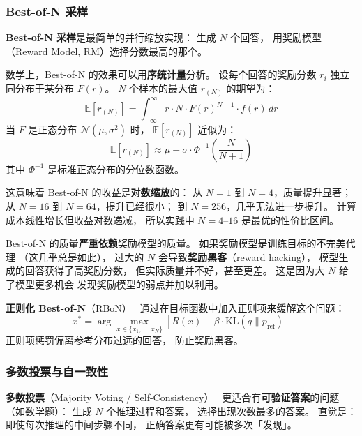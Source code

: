 \subsubsection{Best-of-N 采样}

\textbf{Best-of-N 采样}是最简单的并行缩放实现：
生成 $N$ 个回答，
用奖励模型（Reward Model, RM）选择分数最高的那个。

数学上，Best-of-N 的效果可以用\textbf{序统计量}分析。
设每个回答的奖励分数 $r_i$ 独立同分布于某分布 $F(r)$。
$N$ 个样本的最大值 $r_{(N)}$ 的期望为：
\begin{equation}
  \mathbb{E}[r_{(N)}] = \int_{-\infty}^{\infty} r \cdot N \cdot F(r)^{N-1} \cdot f(r)\, dr
\end{equation}
当 $F$ 是正态分布 $\mathcal{N}(\mu, \sigma^2)$ 时，
$\mathbb{E}[r_{(N)}]$ 近似为：
\begin{equation}
  \mathbb{E}[r_{(N)}] \approx \mu + \sigma \cdot \Phi^{-1}\!\left(\frac{N}{N+1}\right)
\end{equation}
其中 $\Phi^{-1}$ 是标准正态分布的分位数函数。

这意味着 Best-of-N 的收益是\textbf{对数缩放}的：
从 $N=1$ 到 $N=4$，质量提升显著；
从 $N=16$ 到 $N=64$，提升已经很小；
到 $N=256$，几乎无法进一步提升。
计算成本线性增长但收益对数递减，
所以实践中 $N = 4$--$16$ 是最优的性价比区间。

\begin{warnbox}
Best-of-N 的质量\textbf{严重依赖}奖励模型的质量。
如果奖励模型是训练目标的不完美代理
（这几乎总是如此），
过大的 $N$ 会导致\textbf{奖励黑客}（reward hacking），
模型生成的回答获得了高奖励分数，
但实际质量并不好，甚至更差。
这是因为大 $N$ 给了模型更多机会
发现奖励模型的弱点并加以利用。

\textbf{正则化 Best-of-N}（RBoN）~\cite{ichihara2025rbon}
通过在目标函数中加入正则项来缓解这个问题：
\begin{equation}
  x^* = \arg\max_{x \in \{x_1, \ldots, x_N\}} \left[ R(x) - \beta \cdot \mathrm{KL}(q \| p_{\text{ref}}) \right]
\end{equation}
正则项惩罚偏离参考分布过远的回答，
防止奖励黑客。
\end{warnbox}

\subsubsection{多数投票与自一致性}

\textbf{多数投票}（Majority Voting / Self-Consistency）~\cite{wang2023selfconsistency}
更适合有\textbf{可验证答案}的问题（如数学题）：
生成 $N$ 个推理过程和答案，
选择出现次数最多的答案。
直觉是：即使每次推理的中间步骤不同，
正确答案更有可能被多次「发现」。

